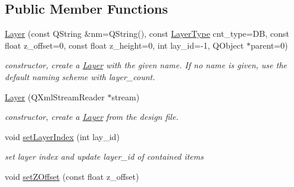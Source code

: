 \subsection*{Public Member Functions}
\begin{DoxyCompactItemize}
\item 
\hyperlink{classprim_1_1Layer_a0aa88b44c1ca33a9fb37048d1955e9e4}{Layer} (const Q\+String \&nm=Q\+String(), const \hyperlink{classprim_1_1Layer_a9a9c22ae767c4671a07293b69c540547}{Layer\+Type} cnt\+\_\+type=DB, const float z\+\_\+offset=0, const float z\+\_\+height=0, int lay\+\_\+id=-\/1, Q\+Object $\ast$parent=0)\hypertarget{classprim_1_1Layer_a0aa88b44c1ca33a9fb37048d1955e9e4}{}\label{classprim_1_1Layer_a0aa88b44c1ca33a9fb37048d1955e9e4}

\begin{DoxyCompactList}\small\item\em constructor, create a \hyperlink{classprim_1_1Layer}{Layer} with the given name. If no name is given, use the default naming scheme with layer\+\_\+count. \end{DoxyCompactList}\item 
\hyperlink{classprim_1_1Layer_adcfacc407024def1aba20b83337209d1}{Layer} (Q\+Xml\+Stream\+Reader $\ast$stream)\hypertarget{classprim_1_1Layer_adcfacc407024def1aba20b83337209d1}{}\label{classprim_1_1Layer_adcfacc407024def1aba20b83337209d1}

\begin{DoxyCompactList}\small\item\em constructor, create a \hyperlink{classprim_1_1Layer}{Layer} from the design file. \end{DoxyCompactList}\item 
void \hyperlink{classprim_1_1Layer_a7a49a82ff912a32d028352b48784ae1a}{set\+Layer\+Index} (int lay\+\_\+id)\hypertarget{classprim_1_1Layer_a7a49a82ff912a32d028352b48784ae1a}{}\label{classprim_1_1Layer_a7a49a82ff912a32d028352b48784ae1a}

\begin{DoxyCompactList}\small\item\em set layer index and update layer\+\_\+id of contained items \end{DoxyCompactList}\item 
void \hyperlink{classprim_1_1Layer_aa9ab5f693f5f2526b34422b5c29606d7}{set\+Z\+Offset} (const float z\+\_\+offset)\hypertarget{classprim_1_1Layer_aa9ab5f693f5f2526b34422b5c29606d7}{}\label{classprim_1_1Layer_aa9ab5f693f5f2526b34422b5c29606d7}


\end{DoxyCompactItemize}
